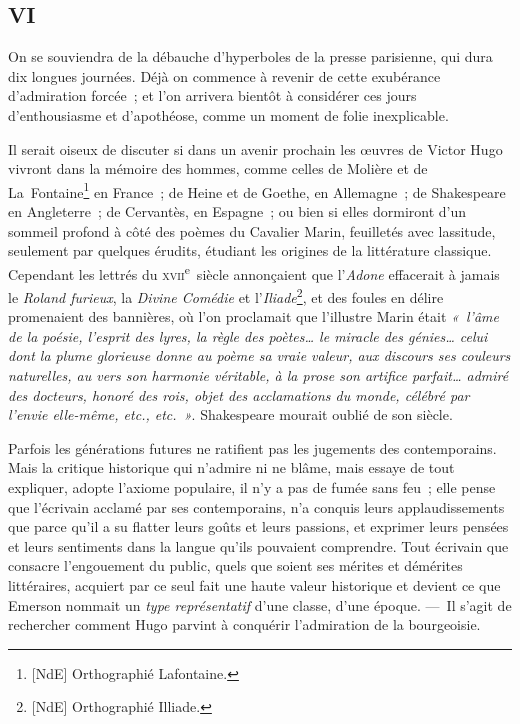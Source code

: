\documentclass[french,twoside]{book} %
\begin{document}
\label{p51}\subsection[{VI}]{VI}
\noindent On se souviendra de la débauche d’hyperboles de la presse parisienne, qui dura dix longues journées. Déjà on commence à revenir de cette exubérance d’admiration forcée ; et l’on arrivera bientôt à considérer ces jours d’enthousiasme et d’apothéose, comme un moment de folie inexplicable.\par
Il serait oiseux de discuter si dans un avenir prochain les œuvres de Victor Hugo vivront dans la mémoire des hommes, comme celles de Molière et de La Fontaine\footnote{[NdE] Orthographié Lafontaine.} en France ; de Heine et de Goethe, en Allemagne ; de Shakespeare en Angleterre ; de Cervantès, en Espagne ; ou bien si elles dormiront d’un sommeil profond à côté des poèmes du Cavalier Marin, feuilletés avec lassitude, seulement par quelques érudits, étudiant les origines de la littérature classique. Cependant les lettrés du \textsc{xvii}\textsuperscript{e} siècle annonçaient que l’\emph{Adone} effacerait à jamais le \emph{Roland furieux}, la \emph{Divine Comédie} et l’\emph{Iliade}\footnote{[NdE] Orthographié Illiade.}, et des foules en délire promenaient des bannières, où l’on proclamait que l’illustre Marin était \emph{« l’âme de la poésie, l’esprit des lyres, la règle des poètes… le miracle des génies… celui dont la plume glorieuse donne au poème sa vraie valeur, aux discours ses couleurs naturelles, au vers son harmonie véritable, à la prose son artifice parfait… admiré des docteurs, honoré des rois, objet des acclamations du monde, célébré par l’envie elle-même, etc., etc. »}. Shakespeare mourait oublié de son siècle.\par
\label{p52}Parfois les générations futures ne ratifient pas les jugements des contemporains. Mais la critique historique qui n’admire ni ne blâme, mais essaye de tout expliquer, adopte l’axiome populaire, il n’y a pas de fumée sans feu ; elle pense que l’écrivain acclamé par ses contemporains, n’a conquis leurs applaudissements que parce qu’il a su flatter leurs goûts et leurs passions, et exprimer leurs pensées et leurs sentiments dans la langue qu’ils pouvaient comprendre. Tout écrivain que consacre l’engouement du public, quels que soient ses mérites et démérites littéraires, acquiert par ce seul fait une haute valeur historique et devient ce que Emerson nommait un {\itshape type représentatif} d’une classe, d’une époque. — Il s’agit de rechercher comment Hugo parvint à conquérir l’admiration de la bourgeoisie.\par
\end{document}
